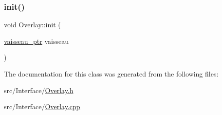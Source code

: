 \mbox{\label{class_overlay_aa4efbb160fcafa1cf5c3e4b454c4cc3b}} 
\subsubsection{\texorpdfstring{init()}{init()}}
{\footnotesize\ttfamily void Overlay\+::init (\begin{DoxyParamCaption}\item[{\mbox{\hyperlink{def__type_8h_a03925a047830157ad843b4224e7f63ba}{vaisseau\+\_\+ptr}}}]{vaisseau }\end{DoxyParamCaption})}



The documentation for this class was generated from the following files\+:\begin{DoxyCompactItemize}
\item 
src/\+Interface/\mbox{\hyperlink{_overlay_8h}{Overlay.\+h}}\item 
src/\+Interface/\mbox{\hyperlink{_overlay_8cpp}{Overlay.\+cpp}}\end{DoxyCompactItemize}
